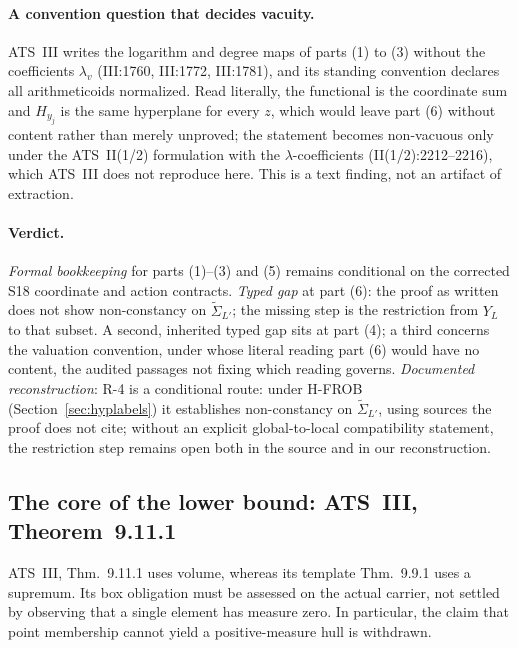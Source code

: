 \documentclass[11pt,a4paper]{article}
\theoremstyle{definition}
\theoremstyle{remark}
\begin{document}
\paragraph{A convention question that decides vacuity.} ATS~III writes the
logarithm and degree maps of parts (1) to (3) without the coefficients $\lambda_v$
(III:1760, III:1772, III:1781), and its standing convention declares all
arithmeticoids normalized. Read literally, the functional is the coordinate sum
and $H_{y_j}$ is the same hyperplane for every $z$, which would leave part (6)
without content rather than merely unproved; the statement becomes non-vacuous
only under the ATS~II(1/2) formulation with the $\lambda$-coefficients
(II(1/2):2212--2216), which ATS~III does not reproduce here. This is a text
finding, not an artifact of extraction.

\paragraph{Verdict.} \emph{Formal bookkeeping} for parts (1)--(3) and (5) remains conditional
on the corrected S18 coordinate and action contracts. \emph{Typed gap} at part (6): the proof as written
does not show non-constancy on $\widetilde{\Sigma}_{L'}$; the missing step is the
restriction from $Y_L$ to that subset. A second, inherited typed gap sits at part
(4); a third concerns the valuation convention, under whose literal reading part
(6) would have no content, the audited passages not fixing which reading governs.
\emph{Documented reconstruction}: R-4 is a conditional route: under H-FROB
(Section~\ref{sec:hyplabels}) it establishes non-constancy on
$\widetilde{\Sigma}_{L'}$, using sources the proof does not cite; without
an explicit global-to-local compatibility statement, the restriction step
remains open both in the source and in our reconstruction.

\subsection{The core of the lower bound: ATS~III, Theorem~9.11.1}\label{sec:s8}

ATS~III, Thm.~9.11.1 uses volume, whereas its template Thm.~9.9.1 uses a
supremum. Its box obligation must be assessed on the actual carrier, not
settled by observing that a single element has measure zero. In particular,
the claim that point membership cannot yield a positive-measure hull is
withdrawn.
\end{document}
